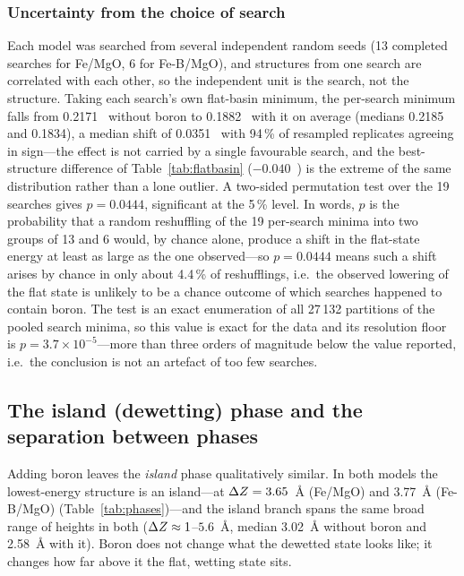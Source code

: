 \subsubsection{Uncertainty from the choice of search} Each model was searched from several independent
random seeds (13 completed searches for Fe/MgO, 6 for Fe-B/MgO), and structures from one search are
correlated with each other, so the independent unit is the search, not the structure. Taking each
search's own flat-basin minimum, the per-search minimum falls from 0.2171~\eVA{} without boron to
0.1882~\eVA{} with it on average (medians 0.2185 and 0.1834), a median shift of
0.0351~\eVA{} with 94\,\% of resampled replicates agreeing in sign---the effect is not carried by a
single favourable search, and the best-structure difference of Table~\ref{tab:flatbasin}
($-0.040$~\eVA) is the extreme of the same distribution rather than a lone outlier. A two-sided
permutation test over the 19 searches gives $p = 0.0444$, significant at the 5\,\% level. In
words, $p$ is the probability that a random reshuffling of the 19 per-search minima into two groups
of 13 and 6 would, by chance alone, produce a shift in the flat-state energy at least as large as the
one observed---so $p = 0.0444$ means such a shift arises by chance in only about 4.4\,\% of
reshufflings, i.e.\ the observed lowering of the flat state is unlikely to be a chance outcome of
which searches happened to contain boron. The test is an exact enumeration of all 27\,132
partitions of the pooled search minima, so this value is exact for the data and its resolution floor
is $p = 3.7\times10^{-5}$---more than three orders of magnitude below the value reported, i.e.\ the
conclusion is not an artefact of too few searches.

\subsection{The island (dewetting) phase and the separation between phases}
\label{sec:island}

Adding boron leaves the \emph{island} phase qualitatively similar. In both models the lowest-energy
structure is an island---at $\Delta Z = 3.65$~\AA{} (Fe/MgO) and 3.77~\AA{} (Fe-B/MgO)
(Table~\ref{tab:phases})---and the island branch spans the same broad range of heights in both
($\Delta Z \approx 1$--$5.6$~\AA, median 3.02~\AA{} without boron and 2.58~\AA{} with it). Boron does not
change what the dewetted state looks like; it changes how far above it the flat, wetting state sits.

